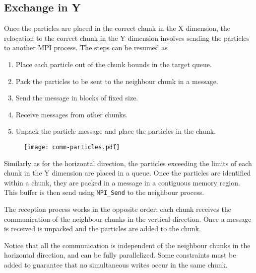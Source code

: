 \subsection{Exchange in Y}
Once the particles are placed in the correct chunk in the X dimension, the 
relocation to the correct chunk in the Y dimension involves sending the 
particles to another MPI process. The steps can be resumed as
%
\begin{enumerate}
\item Place each particle out of the chunk bounds in the target queue.
\item Pack the particles to be sent to the neighbour chunk in a message.
\item Send the message in blocks of fixed size.
\item Receive messages from other chunks.
\item Unpack the particle message and place the particles in the chunk.
\end{enumerate}
%
\begin{figure}
\centering
\texttt{[image: comm-particles.pdf]}
\end{figure}
%
Similarly as for the horizontal direction, the particles exceeding the limits of 
each chunk in the Y dimension are placed in a queue.  Once the particles are 
identified within a chunk, they are packed in a message in a contiguous memory 
region. This buffer is then send using \texttt{MPI\_Send} to the neighbour 
process.

The reception process works in the opposite order: each chunk receives the 
communication of the neighbour chunks in the vertical direction. Once a message 
is received is unpacked and the particles are added to the chunk.

Notice that all the communication is independent of the neighbour chunks in the 
horizontal direction, and can be fully parallelized. Some constraints must be 
added to guarantee that no simultaneous writes occur in the same chunk.
